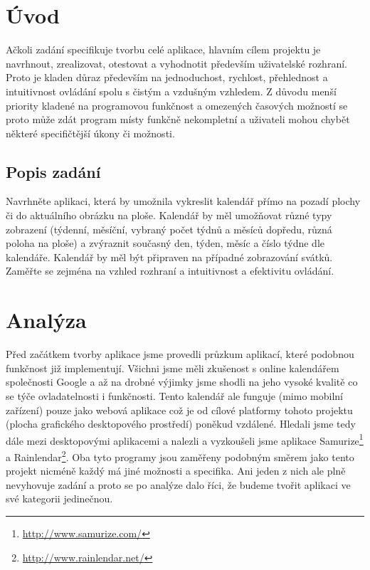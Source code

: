 \documentclass[a4paper, 12pt]{article}[7.12.2013]
\begin{document}

\tableofcontents
\clearpage

\section{Úvod} \label{uvod}
Ačkoli zadání specifikuje tvorbu celé aplikace, hlavním cílem projektu je navrhnout, zrealizovat, otestovat a vyhodnotit především uživatelské rozhraní. Proto je kladen důraz především na jednoduchost, rychlost, přehlednost a intuitivnost ovládání spolu s čistým a vzdušným vzhledem. Z důvodu menší priority kladené na programovou funkčnost a omezených časových možností se proto může zdát program místy funkčně nekompletní a uživateli mohou chybět některé specifičtější úkony či možnosti.

\subsection{Popis zadání}
Navrhněte aplikaci, která by umožnila vykreslit kalendář přímo na pozadí plochy či do aktuálního obrázku na ploše. Kalendář by měl umožňovat různé typy zobrazení (týdenní, měsíční, vybraný počet týdnů a měsíců dopředu, různá poloha na ploše) a zvýraznit současný den, týden, měsíc a číslo týdne dle kalendáře. Kalendář by měl být připraven na případné zobrazování svátků. Zaměřte se zejména na vzhled rozhraní a intuitivnost a efektivitu ovládání.

\section{Analýza} \label{analyza}
Před začátkem tvorby aplikace jsme provedli průzkum aplikací, které podobnou funkčnost již implementují. Všichni jsme měli zkušenost s online kalendářem společnosti Google a až na drobné výjimky jsme shodli na jeho vysoké kvalitě co se týče ovladatelnosti i funkčnosti. Tento kalendář ale funguje (mimo mobilní zařízení) pouze jako webová aplikace což je od cílové platformy tohoto projektu (plocha grafického desktopového prostředí) poněkud vzdálené. Hledali jsme tedy dále mezi desktopovými aplikacemi a nalezli a vyzkoušeli jsme aplikace Samurize\footnote{\url{http://www.samurize.com/}} a Rainlendar\footnote{\url{http://www.rainlendar.net/}}. Oba tyto programy jsou zaměřeny podobným směrem jako tento projekt nicméně každý má jiné možnosti a specifika. Ani jeden z nich ale plně nevyhovuje zadání a proto se po analýze dalo říci, že budeme tvořit aplikaci ve své kategorii jedinečnou.
\end{document}
